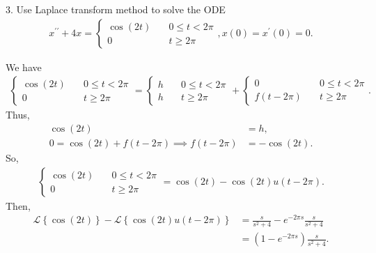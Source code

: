 \documentclass{report}
\begin{document}
    \bigbreak \noindent 
    \begin{mdframed}
        3. Use Laplace transform method to solve the ODE
        \begin{align*}
            x^{\prime\prime} + 4x = 
            \begin{cases}
                \cos{\left(2t\right)}     &\quad 0  \leq t < 2\pi \\
                0 &\quad t \geq 2\pi
            \end{cases}, x(0) = x^{\prime}(0) = 0
        .\end{align*}
    \end{mdframed}
    \bigbreak \noindent 
    We have
    \begin{align*}
        \begin{cases}
            \cos{\left(2t\right)}     &\quad 0  \leq t < 2\pi \\
            0 &\quad t \geq 2\pi
        \end{cases}
        =
        \begin{cases}
            h     &\quad 0  \leq t < 2\pi \\
            h &\quad t \geq 2\pi
        \end{cases}
        +
        \begin{cases}
            0     &\quad 0  \leq t < 2\pi \\
            f(t-2\pi) &\quad t \geq 2\pi
        \end{cases}
    .\end{align*}
    Thus,
    \begin{align*}
        \cos{\left(2t\right)}  &= h, \\
        0 = \cos{\left(2t\right)} + f(t-2\pi) \implies f(t-2\pi) &= -\cos{\left(2t\right)}
    .\end{align*}
    So,
    \begin{align*}
        \begin{cases}
            \cos{\left(2t\right)}     &\quad 0  \leq t < 2\pi \\
            0 &\quad t \geq 2\pi
        \end{cases}
        =
        \cos{\left(2t\right)} - \cos{\left(2t\right)}u(t-2\pi)
    .\end{align*}
    Then,
    \begin{align*}
        \mathcal{L}\left\{\cos{\left(2t\right)}\right\} - \mathcal{L}\left\{\cos{\left(2t\right)}u(t-2\pi)\right\} &= \frac{s}{s^{2}+4} - e^{-2\pi s}\frac{s}{s^{2} + 4} \\
                                                                                                                   &= (1-e^{-2\pi s})\frac{s}{s^{2}+4}
    .\end{align*}
\end{document}
